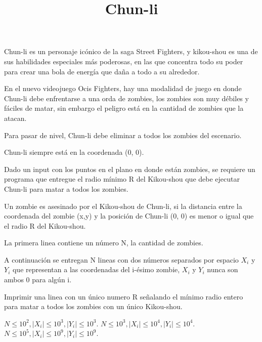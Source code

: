\documentclass{oci}
\title{Chun-li}
\begin{document}
\begin{problemDescription}
Chun-li es un personaje icónico de la saga Street Fighters, y kikou-shou es una de sus habilidades especiales más poderosas, en las que concentra todo su poder para crear una bola de energía que daña a todo a su alrededor.

En el nuevo videojuego Ocis Fighters, hay una modalidad de juego en donde Chun-li debe enfrentarse a una orda de zombies, los zombies son muy débiles y fáciles de matar, sin embargo el peligro está en la cantidad de zombies que la atacan.

Para pasar de nivel, Chun-li debe eliminar a todos los zombies del escenario.

Chun-li siempre está en la coordenada (0, 0).

Dado un input con los puntos en el plano en donde están zombies, se requiere un programa que entregue el radio mínimo R del Kikou-shou que debe ejecutar Chun-li para matar a todos los zombies.

Un zombie es asesinado por el Kikou-shou de Chun-li, si la distancia entre la coordenada del zombie (x,y) y la posición de Chun-li (0, 0) es menor o igual que el radio R del Kikou-shou.

\end{problemDescription}

\begin{inputDescription}
La primera linea contiene un número N, la cantidad de zombies.

A continuación se entregan N lineas con dos números separados por espacio $X_i$ y $Y_i$ que representan a las coordenadas del i-ésimo zombie, $X_i$ y $Y_i$ nunca son ambos 0 para algún i.

\end{inputDescription}

\begin{outputDescription}

Imprimir una linea con un único numero R señalando el mínimo radio entero para matar a todos los zombies con un único Kikou-shou.

\end{outputDescription}

\begin{scoreDescription}
   $N \leq 10^2, \left | X_i \right | \leq 10^3,  \left | Y_i \right | \leq 10^3$.
   $N \leq 10^3, \left | X_i \right | \leq 10^4,  \left | Y_i \right | \leq 10^4$.
   $N \leq 10^5, \left | X_i \right | \leq 10^9,  \left | Y_i \right | \leq 10^9$.
\end{scoreDescription}

\begin{sampleDescription}
\end{sampleDescription}
\end{document}

